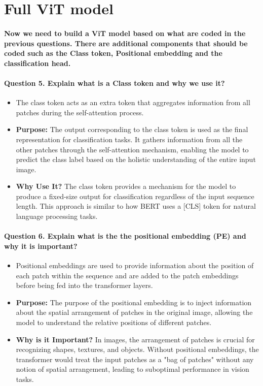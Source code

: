 \documentclass{article}
\begin{document}
\section{Full ViT model}
\paragraph{Now we need to build a ViT model based on what are coded in the previous questions. There are additional components that should be coded such as the Class token, Positional embedding and the classification head.}
\paragraph{Question 5. Explain what is a Class token and why we use it?}
\begin{itemize}
    \item The class token acts as an extra token that aggregates information from all patches during the self-attention process.
    \item \textbf{Purpose:} The output corresponding to the class token is used as the final representation for classification tasks. It gathers information from all the other patches through the self-attention mechanism, enabling the model to predict the class label based on the holistic understanding of the entire input image. 
    \item \textbf{Why Use It?} The class token provides a mechanism for the model to produce a fixed-size output for classification regardless of the input sequence length. This approach is similar to how BERT uses a [CLS] token for natural language processing tasks. 
\end{itemize}

\paragraph{Question 6. 
Explain what is the the positional embedding (PE) and why it is important?
 }

 \begin{itemize}
     \item Positional embeddings are used to provide information about the position of each patch within the sequence and are added to the patch embeddings before being fed into the transformer layers. 
     \item \textbf{Purpose:} The purpose of the positional embedding is to inject information about the spatial arrangement of patches in the original image, allowing the model to understand the relative positions of different patches. 
     \item \textbf{Why is it Important?} In images, the arrangement of patches is crucial for recognizing shapes, textures, and objects. Without positional embeddings, the transformer would treat the input patches as a "bag of patches" without any notion of spatial arrangement, leading to suboptimal performance in vision tasks. 

 \end{itemize}
\end{document}
